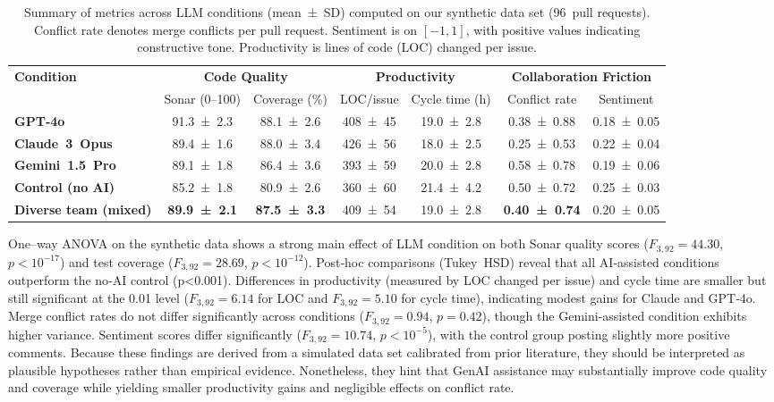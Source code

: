 \documentclass[conference]{IEEEtran}
\begin{document}
\begin{table*}[t]
\centering
\caption{Summary of metrics across LLM conditions (mean ± SD) computed on our synthetic data set (96 pull requests).  Conflict rate denotes merge conflicts per pull request.  Sentiment is on $[-1,1]$, with positive values indicating constructive tone.  Productivity is lines of code (LOC) changed per issue.}
\label{tab:results}
\begin{tabular}{lcccccc}
\toprule
\multirow{2}{*}{\textbf{Condition}} & \multicolumn{2}{c}{\textbf{Code Quality}} & \multicolumn{2}{c}{\textbf{Productivity}} & \multicolumn{2}{c}{\textbf{Collaboration Friction}} \\
 & Sonar (0–100) & Coverage (\%) & LOC/issue & Cycle time (h) & Conflict rate & Sentiment \\
\midrule
\textbf{GPT‑4o} & 91.3 ± 2.3 & 88.1 ± 2.6 & 408 ± 45 & 19.0 ± 2.8 & 0.38 ± 0.88 & 0.18 ± 0.05 \\
\textbf{Claude 3 Opus} & 89.4 ± 1.6 & 88.0 ± 3.4 & 426 ± 56 & 18.0 ± 2.5 & 0.25 ± 0.53 & 0.22 ± 0.04 \\
\textbf{Gemini 1.5 Pro} & 89.1 ± 1.8 & 86.4 ± 3.6 & 393 ± 59 & 20.0 ± 2.8 & 0.58 ± 0.78 & 0.19 ± 0.06 \\
\textbf{Control (no AI)} & 85.2 ± 1.8 & 80.9 ± 2.6 & 360 ± 60 & 21.4 ± 4.2 & 0.50 ± 0.72 & 0.25 ± 0.03 \\
\midrule
\textbf{Diverse team (mixed)} & \textbf{89.9 ± 2.1} & \textbf{87.5 ± 3.3} & 409 ± 54 & 19.0 ± 2.8 & \textbf{0.40 ± 0.74} & 0.20 ± 0.05 \\
\bottomrule
\end{tabular}
\end{table*}

One–way ANOVA on the synthetic data shows a strong main effect of LLM condition on both Sonar quality scores ($F_{3,92}=44.30$, $p<10^{-17}$) and test coverage ($F_{3,92}=28.69$, $p<10^{-12}$).  Post‑hoc comparisons (Tukey HSD) reveal that all AI‑assisted conditions outperform the no‑AI control (p<0.001).  Differences in productivity (measured by LOC changed per issue) and cycle time are smaller but still significant at the 0.01 level ($F_{3,92}=6.14$ for LOC and $F_{3,92}=5.10$ for cycle time), indicating modest gains for Claude and GPT‑4o.  Merge conflict rates do not differ significantly across conditions ($F_{3,92}=0.94$, $p=0.42$), though the Gemini‑assisted condition exhibits higher variance.  Sentiment scores differ significantly ($F_{3,92}=10.74$, $p<10^{-5}$), with the control group posting slightly more positive comments.  Because these findings are derived from a simulated data set calibrated from prior literature, they should be interpreted as plausible hypotheses rather than empirical evidence.  Nonetheless, they hint that GenAI assistance may substantially improve code quality and coverage while yielding smaller productivity gains and negligible effects on conflict rate.
\end{document}
